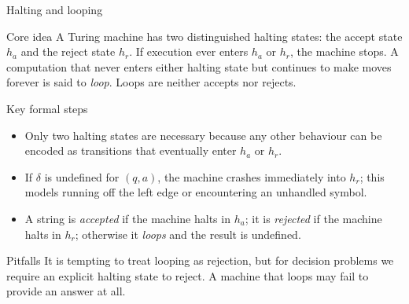 \begin{frame}[t]{Halting and looping}
  \begin{tblock}{Core idea}
    A Turing machine has two distinguished halting states: the accept
    state $h_a$ and the reject state $h_r$.  If execution ever enters
    $h_a$ or $h_r$, the machine stops.  A computation that never enters
    either halting state but continues to make moves forever is said to
    \emph{loop}.  Loops are neither accepts nor rejects.
  \end{tblock}
  \begin{tblock}{Key formal steps}
    \begin{itemize}
      \item Only two halting states are necessary because any other
        behaviour can be encoded as transitions that eventually enter
        $h_a$ or $h_r$.
      \item If $\delta$ is undefined for $(q,a)$, the machine crashes
        immediately into $h_r$; this models running off the left edge
        or encountering an unhandled symbol.
      \item A string is \emph{accepted} if the machine halts in $h_a$;
        it is \emph{rejected} if the machine halts in $h_r$; otherwise it
        \emph{loops} and the result is undefined.
    \end{itemize}
  \end{tblock}
  \begin{talert}{Pitfalls}
    It is tempting to treat looping as rejection, but for decision
    problems we require an explicit halting state to reject.  A machine
    that loops may fail to provide an answer at all.
  \end{talert}
  \label{fr:7.1-07}
\end{frame}

